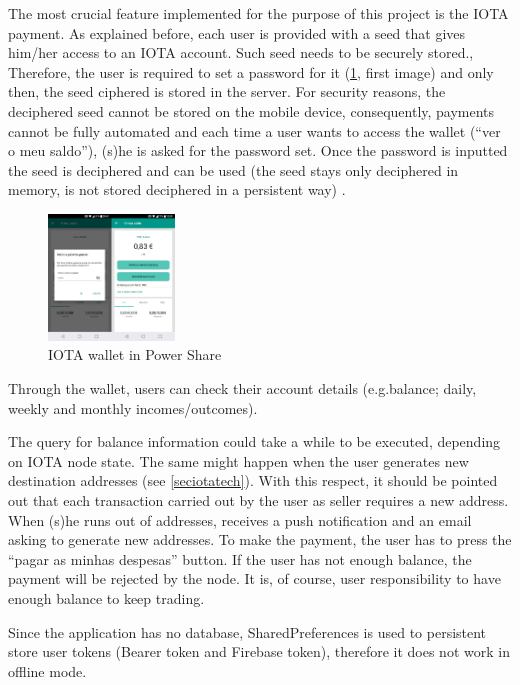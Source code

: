 The most crucial feature implemented for the purpose of this project is the IOTA payment. As explained before, each user is provided with a seed that gives him/her access to an IOTA account. Such seed needs to be securely stored.,  Therefore, the user is required to set a password for it (\cref{fig:ps11}, first image) and only then, the seed ciphered is stored in the server. For security reasons, the deciphered seed cannot be stored on the mobile device, consequently, payments cannot be fully automated and each time a user wants to access the wallet (“ver o meu saldo”), (s)he is asked for the password set. Once the password is inputted the seed is deciphered and can be used (the seed stays only deciphered in memory, is not stored deciphered in a persistent way) .


\begin{figure}[h]
\centering
\includegraphics[width=0.3\textwidth]{./Images/ps11}
\caption{IOTA wallet in Power Share}
\label{fig:ps11}
\end{figure}

Through the wallet, users can check their account details (e.g.balance; daily, weekly and monthly incomes/outcomes).



The query for balance information could take a while to be executed, depending on IOTA node state. The same might happen when the user generates  new destination addresses (see \cref{seciotatech}). With this respect, it should be pointed out that each transaction carried out by the user as seller requires a new address. When (s)he runs out of addresses, receives a push notification and an email asking to generate new addresses. To make the payment, the user has to press the “pagar as minhas despesas” button. If the user has not enough balance, the payment will be rejected by the node. It is, of course,  user responsibility to have enough balance to keep trading.


Since the application has no database, SharedPreferences is used to persistent store user tokens (Bearer token and Firebase token), therefore it does not work in offline mode. 


